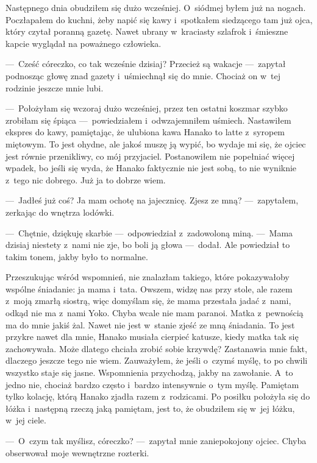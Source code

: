\paraSep

Następnego dnia obudziłem się dużo wcześniej. O~siódmej byłem już na nogach. Poczłapałem do kuchni, żeby napić się kawy i~spotkałem siedzącego tam już ojca, który czytał poranną gazetę. Nawet ubrany w~kraciasty szlafrok i~śmieszne kapcie wyglądał na poważnego człowieka. 

---~Cześć córeczko, co tak wcześnie dzisiaj? Przecież są wakacje ---~zapytał podnosząc głowę znad gazety i~uśmiechnął się do mnie. Chociaż on w~tej rodzinie jeszcze mnie lubi.

---~Położyłam się wczoraj dużo wcześniej, przez ten ostatni koszmar szybko zrobiłam się śpiąca ---~powiedziałem i~odwzajemniłem uśmiech. Nastawiłem ekspres do kawy, pamiętając, że ulubiona kawa Hanako to latte z~syropem miętowym. To jest ohydne, ale jakoś muszę  ją wypić, bo wydaje mi się, że ojciec jest równie przenikliwy, co mój przyjaciel. Postanowiłem nie popełniać więcej wpadek, bo jeśli się wyda, że Hanako faktycznie nie jest sobą, to nie wyniknie z~tego nic dobrego. Już ja to dobrze wiem.

---~Jadłeś już coś? Ja mam ochotę na jajecznicę. Zjesz ze mną? ---~zapytałem, zerkając do wnętrza lodówki.

---~Chętnie, dziękuję skarbie ---~odpowiedział z~zadowoloną miną. ---~Mama dzisiaj niestety z~nami nie zje, bo boli ją głowa ---~dodał. Ale powiedział to takim tonem, jakby było to normalne. 

Przeszukując wśród wspomnień, nie znalazłam takiego, które pokazywałoby wspólne śniadanie: ja mama i~tata. Owszem, widzę nas przy stole, ale razem z~moją zmarłą siostrą, więc domyślam się, że mama przestała jadać z~nami, odkąd nie ma z~nami Yoko. Chyba wcale nie mam paranoi. Matka z~pewnością ma do mnie jakiś żal. Nawet nie jest w~stanie zjeść ze mną śniadania. To jest przykre nawet dla mnie, Hanako musiała cierpieć katusze, kiedy matka tak się zachowywała. Może dlatego chciała zrobić sobie krzywdę? Zastanawia mnie fakt, dlaczego jeszcze tego nie wiem. Zauważyłem, że jeśli o~czymś myślę, to po chwili wszystko staje się jasne. Wspomnienia przychodzą, jakby na zawołanie. A~to jedno nie, chociaż bardzo często i~bardzo intensywnie o~tym myślę. Pamiętam tylko kolację, którą Hanako zjadła razem z~rodzicami. Po posiłku położyła się do łóżka i~następną rzeczą jaką pamiętam, jest to, że obudziłem się w~jej łóżku, w~jej ciele. 

---~O~czym tak myślisz, córeczko? ---~zapytał mnie zaniepokojony ojciec. Chyba obserwował moje wewnętrzne rozterki.

